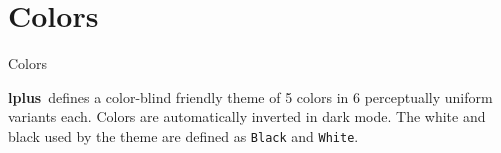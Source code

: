 \documentclass[aspectratio=169]{beamer}
\newcommand{\themename}{\textbf{lplus}~}
\begin{document}
\section{Colors}
\begin{frame}{Colors}

\themename defines a color-blind friendly theme of 5 colors in 6 perceptually uniform variants each. Colors are automatically inverted in dark mode. The white and black used by the theme are defined as \texttt{Black} and \texttt{White}.

\begin{center}
\end{center}
\end{frame}
\end{document}
